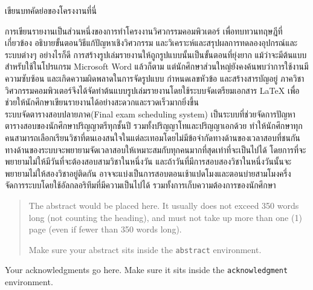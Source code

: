 \maketitle
\makesignature

\ifproject
\begin{abstractTH}
เขียนบทคัดย่อของโครงงานที่นี่

การเขียนรายงานเป็นส่วนหนึ่งของการทำโครงงานวิศวกรรมคอมพิวเตอร์
เพื่อทบทวนทฤษฎีที่เกี่ยวข้อง อธิบายขั้นตอนวิธีแก้ปัญหาเชิงวิศวกรรม และวิเคราะห์และสรุปผลการทดลองอุปกรณ์และระบบต่างๆ
\enskip อย่างไรก็ดี การสร้างรูปเล่มรายงานให้ถูกรูปแบบนั้นเป็นขั้นตอนที่ยุ่งยาก
แม้ว่าจะมีต้นแบบสำหรับใช้ในโปรแกรม Microsoft Word แล้วก็ตาม
แต่นักศึกษาส่วนใหญ่ยังคงค้นพบว่าการใช้งานมีความซับซ้อน และเกิดความผิดพลาดในการจัดรูปแบบ กำหนดเลขหัวข้อ และสร้างสารบัญอยู่
\enskip ภาควิชาวิศวกรรมคอมพิวเตอร์จึงได้จัดทำต้นแบบรูปเล่มรายงานโดยใช้ระบบจัดเตรียมเอกสาร
\LaTeX{} เพื่อช่วยให้นักศึกษาเขียนรายงานได้อย่างสะดวกและรวดเร็วมากยิ่งขึ้น
\\ระบบจัดตารางสอบปลายภาค(Final exam scheduling system) เป็นระบบที่ช่วยจัดการปัญหาตารางสอบของนักศึกษาปริญญาตรีทุกชั้นปี 
รวมทั้งปริญญาโทและปริญญาเอกด้วย ทำให้นักศึกษาทุกคนสามารถเลือกเรียนวิชาที่ตนเองสนใจในแต่ละเทอมโดยไม่มีข้อจำกัดทางด้านของเวลาสอบที่ชนกัน
ทางด้านของระบบจะพยายามจัดเวลาสอบให้เหมาะสมกับทุกคนมากที่สุดเท่าที่จะเป็นไปได้ โดยการที่จะพยายามไม่ให้มีวันที่จะต้องสอบสามวิชาในหนึ่งวัน 
และถ้าวันที่มีการสอบสองวิชาในหนึ่งวันนั้นจะพยายามไม่ให้สองวิชาอยู่ติดกัน อาจจะแบ่งเป็นการสอบตอนเช้าแปดโมงและตอนบ่ายสามโมงครึ่ง 
\\จัดการระบบโดยใช้อัลกลอริทึมที่มีความเป็นไปได้ รวมทั้งการเก็บความต้องการของนักศึกษา

\end{abstractTH}

\begin{abstract}
The abstract would be placed here. It usually does not exceed 350 words
long (not counting the heading), and must not take up more than one (1) page
(even if fewer than 350 words long).

Make sure your abstract sits inside the \texttt{abstract} environment.
\end{abstract}

\iffalse
\begin{dedication}
This document is dedicated to all Chiang Mai University students.

Dedication page is optional.
\end{dedication}
\fi %

\begin{acknowledgments}
Your acknowledgments go here. Make sure it sits inside the
\texttt{acknowledgment} environment.

\end{acknowledgments}%
\fi %

\contentspage

\ifproject
\figurelistpage

\tablelistpage
\fi %



